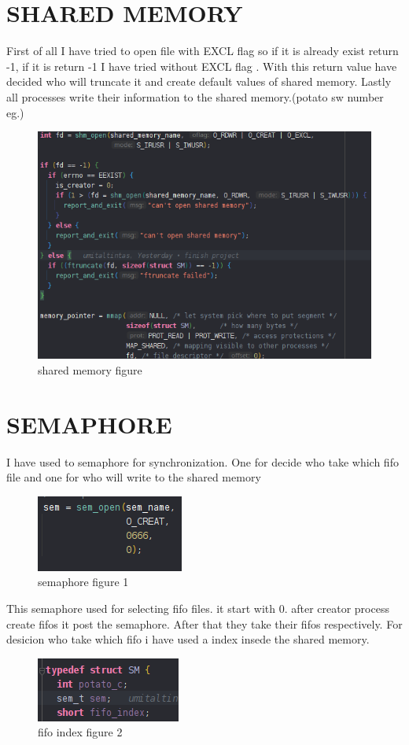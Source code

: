 \documentclass{article}
\begin{document}
\section{SHARED MEMORY}
First of all I have tried to open file with EXCL  flag so if it is already exist return -1, if it is return -1 I have tried without  EXCL  flag . With this return value have decided who will truncate it  and  create  default values of shared memory.
Lastly all processes write their information to the shared memory.(potato sw number eg.)
\begin{figure}[htbp!]  
    \centering
    \includegraphics[scale=0.8]{shared.png}
    \caption{shared memory figure}
    \label{fig:shared memory}
\end{figure}
\pagebreak


\section{SEMAPHORE}
I have used to semaphore for synchronization. One for decide who take which fifo file and one for who will write to the shared memory

\begin{figure}[htbp!]  
    \centering
    \includegraphics[scale=1]{sem1.png}
    \caption{semaphore figure 1}
    \label{fig:semaphore1}
\end{figure}
This semaphore used for selecting fifo files. it start with 0. after creator process create fifos it post the semaphore. After that they take their fifos respectively. 
For desicion who take which fifo i have used a index insede the shared memory.
\begin{figure}[htbp!]  
    \centering
    \includegraphics[scale=1]{shrm-fifo-index.png}
    \caption{fifo index figure 2}
    \label{fig:fifo-index}
\end{figure}
\end{document}
